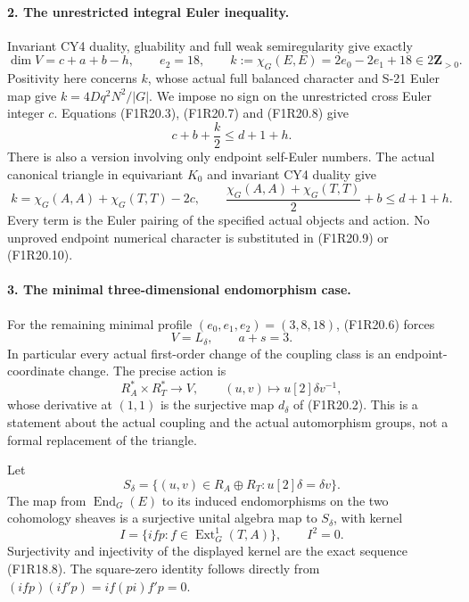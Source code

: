 \paragraph{2. The unrestricted integral Euler inequality.}
Invariant CY4 duality, gluability and full weak
semiregularity give exactly
\[
 \dim V=c+a+b-h,\qquad e_2=18,\qquad
 k:=\chi_G(E,E)=2e_0-2e_1+18\in2\mathbf Z_{>0}.
 \tag{F1R20.8}
\]
Positivity here concerns $k$, whose actual full balanced
character and S-21 Euler map give
$k=4Dq^2N^2/|G|$. We impose no sign on the unrestricted
cross Euler integer $c$. Equations (F1R20.3),
(F1R20.7) and (F1R20.8) give
\[
                            c+b+\frac{k}{2}\le d+1+h.
 \tag{F1R20.9}
\]
There is also a version involving only endpoint self-Euler
numbers. The actual canonical triangle in equivariant
$K_0$ and invariant CY4 duality give
\[
 k=\chi_G(A,A)+\chi_G(T,T)-2c,
 \qquad
 \frac{\chi_G(A,A)+\chi_G(T,T)}2+b\le d+1+h.
 \tag{F1R20.10}
\]
Every term is the Euler pairing of the specified actual
objects and action. No unproved endpoint numerical
character is substituted in (F1R20.9) or (F1R20.10).

\paragraph{3. The minimal three-dimensional endomorphism case.}
For the remaining minimal profile
$(e_0,e_1,e_2)=(3,8,18)$, (F1R20.6) forces
\[
                         V=L_\delta,\qquad a+s=3.
 \tag{F1R20.11}
\]
In particular every actual first-order change of the
coupling class is an endpoint-coordinate change. The
precise action is
\[
 R_A^*\times R_T^*\longrightarrow V,\qquad
           (u,v)\longmapsto u[2]\delta v^{-1},
 \tag{F1R20.12}
\]
whose derivative at $(1,1)$ is the surjective map
$d_\delta$ of (F1R20.2). This is a statement about the
actual coupling and the actual automorphism groups,
not a formal replacement of the triangle.

Let
\[
 S_\delta=\{(u,v)\in R_A\oplus R_T:
                         u[2]\delta=\delta v\}.
 \tag{F1R20.13}
\]
The map from $\operatorname{End}_G(E)$ to its induced
endomorphisms on the two cohomology sheaves is a
surjective unital algebra map to $S_\delta$, with
kernel
\[
 I=\{ifp:f\in\operatorname{Ext}^1_G(T,A)\},\qquad I^2=0.
 \tag{F1R20.14}
\]
Surjectivity and injectivity of the displayed kernel
are the exact sequence (F1R18.8). The square-zero
identity follows directly from
$(ifp)(if'p)=if(pi)f'p=0$.

